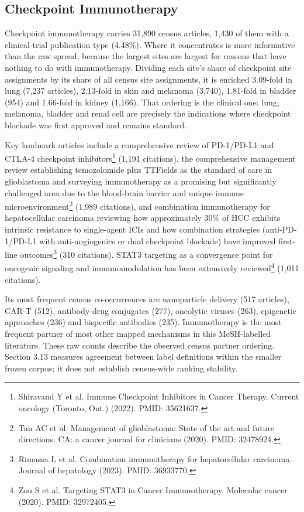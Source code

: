\documentclass[11pt,twoside,openright]{report}
\begin{document}
\subsection{Checkpoint Immunotherapy}

Checkpoint immunotherapy carries 31,890 census articles, 1,430 of them with a clinical-trial publication type (4.48\%). Where it concentrates is more informative than the raw spread, because the largest sites are largest for reasons that have nothing to do with immunotherapy. Dividing each site's share of checkpoint site assignments by its share of all census site assignments, it is enriched 3.09-fold in lung (7,237 articles), 2.13-fold in skin and melanoma (3,740), 1.81-fold in bladder (954) and 1.66-fold in kidney (1,166). That ordering is the clinical one: lung, melanoma, bladder and renal cell are precisely the indications where checkpoint blockade was first approved and remains standard.

Key landmark articles include a comprehensive review of PD-1/PD-L1 and CTLA-4 checkpoint inhibitors\footnote{Shiravand Y et al. Immune Checkpoint Inhibitors in Cancer Therapy. Current oncology (Toronto, Ont.) (2022). PMID: 35621637.} (1,191 citations), the comprehensive management review establishing temozolomide plus TTFields as the standard of care in glioblastoma and surveying immunotherapy as a promising but significantly challenged area due to the blood-brain barrier and unique immune microenvironment\footnote{Tan AC et al. Management of glioblastoma: State of the art and future directions. CA: a cancer journal for clinicians (2020). PMID: 32478924.} (1,989 citations), and combination immunotherapy for hepatocellular carcinoma reviewing how approximately 30\% of HCC exhibits intrinsic resistance to single-agent ICIs and how combination strategies (anti-PD-1/PD-L1 with anti-angiogenics or dual checkpoint blockade) have improved first-line outcomes\footnote{Rimassa L et al. Combination immunotherapy for hepatocellular carcinoma. Journal of hepatology (2023). PMID: 36933770.} (310 citations). STAT3 targeting as a convergence point for oncogenic signaling and immunomodulation has been extensively reviewed\footnote{Zou S et al. Targeting STAT3 in Cancer Immunotherapy. Molecular cancer (2020). PMID: 32972405.} (1,011 citations).

Its most frequent census co-occurrences are nanoparticle delivery (517 articles), CAR-T (512), antibody-drug conjugates (277), oncolytic viruses (263), epigenetic approaches (236) and bispecific antibodies (235). Immunotherapy is the most frequent partner of most other mapped mechanisms in this MeSH-labelled literature. These raw counts describe the observed census partner ordering. Section 3.13 measures agreement between label definitions within the smaller frozen corpus; it does not establish census-wide ranking stability.
\end{document}
